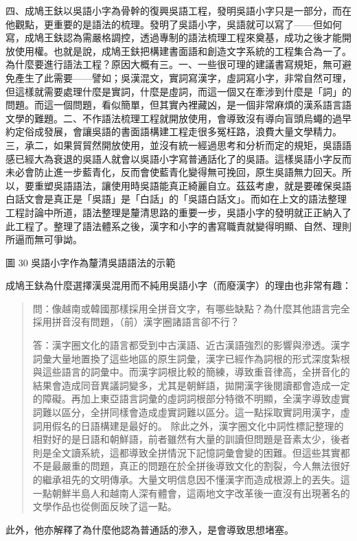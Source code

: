 \documentclass[a5paper, 12pt, openany]{book} %
\begin{document}
四、成鳩王鈇以吳語小字為骨幹的復興吳語工程，發明吳語小字只是一部分，而在他觀點，更重要的是語法的梳理。發明了吳語小字，吳語就可以寫了——但如何寫，成鳩王鈇認為需嚴格調控，透過專制的語法梳理工程來奠基，成功之後才能開放使用權。也就是說，成鳩王鈇把構建書面語和創造文字系統的工程集合為一了。為什麼要進行語法工程？原因大概有三。一、一些很可理的建議書寫規矩，無可避免產生了此需要——譬如；吳漢混文，實詞寫漢字，虛詞寫小字，非常自然可理，但這樣就需要處理什麼是實詞，什麼是虛詞，而這一個又在牽涉到什麼是「詞」的問題。而這一個問題，看似簡單，但其實內裡藏凶，是一個非常麻煩的漢系語言語文學的難題。二、不作語法梳理工程就開放使用，會導致沒有導向盲頭烏蠅的過早約定俗成發展，會讓吳語的書面語構建工程走很多冤枉路，浪費大量文學精力。三，承二，如果貿貿然開放使用，並沒有統一經過思考和分析而定的規矩，吳語語感已經大為衰退的吳語人就會以吳語小字寫普通話化了的吳語。這樣吳語小字反而未必會防止進一步藍青化，反而會使藍青化變得無可挽回，原生吳語無力回天。所以，要重塑吳語語法，讓使用時吳語能真正綺麗自立。茲茲考慮，就是要確保吳語白話文會是真正是「吳語」是「白話」的「吳語白話文」。而如在上文的語法整理工程討論中所道，語法整理是釐清思路的重要一步，吳語小字的發明就正正納入了此工程了。整理了語法體系之後，漢字和小字的書寫職責就變得明顯、自然、理則所逼而無可爭詏。


圖 30 吳語小字作為釐清吳語語法的示範 

成鳩王鈇為什麼選擇漢吳混用而不純用吳語小字（而廢漢字）的理由也非常有趣：
\begin{quotation}


問：像越南或韓國那樣採用全拼音文字，有哪些缺點？為什麼其他語言完全採用拼音沒有問題，（前）漢字圈諸語言卻不行？

答：漢字圈文化的語言都受到中古漢語、近古漢語強烈的影響與滲透。漢字詞彙大量地置換了這些地區的原生詞彙，漢字已經作為詞根的形式深度紮根與這些語言的詞彙中。而漢字詞根比較的簡練，導致重音律高，全拼音化的結果會造成同音異議詞變多，尤其是朝鮮語，拋開漢字後閱讀都會造成一定的障礙。再加上東亞語言詞彙的虛詞詞根部分特徵不明顯，全漢字導致虛實詞難以區分，全拼同樣會造成虛實詞難以區分。這一點採取實詞用漢字，虛詞用假名的日語構建是最好的。
除此之外，漢字圈文化中詞性標記整理的相對好的是日語和朝鮮語，前者雖然有大量的訓讀但問題是音素太少，後者則是全文讀系統，這都導致全拼情況下記憶詞彙會變的困難。但這些其實都不是最嚴重的問題，真正的問題在於全拼後導致文化的割裂，今人無法很好的繼承祖先的文明傳承。大量文明信息因不懂漢字而造成根源上的丟失。這一點朝鮮半島人和越南人深有體會，這兩地文字改革後一直沒有出現著名的文學作品也從側面反映了這一點。 
\end{quotation}

此外，他亦解釋了為什麼他認為普通話的滲入，是會導致思想堵塞。
\end{document}
